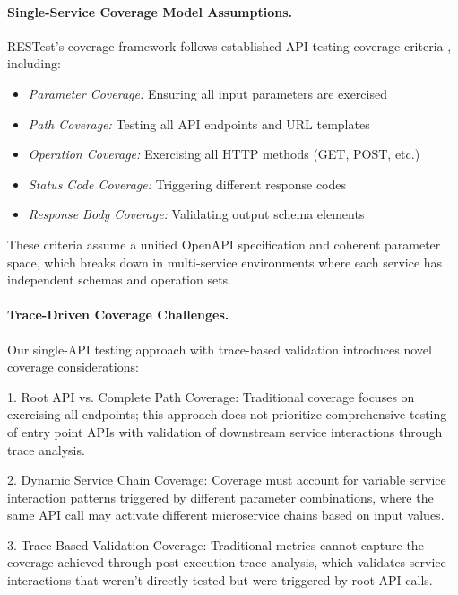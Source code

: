 \documentclass[conference]{IEEEtran}
\begin{document}
\paragraph{Single-Service Coverage Model Assumptions.}
RESTest's coverage framework follows established API testing coverage criteria \cite{martin2019restest}, including:
\begin{itemize}[leftmargin=*]
    \item \textit{Parameter Coverage:} Ensuring all input parameters are exercised
    \item \textit{Path Coverage:} Testing all API endpoints and URL templates  
    \item \textit{Operation Coverage:} Exercising all HTTP methods (GET, POST, etc.)
    \item \textit{Status Code Coverage:} Triggering different response codes
    \item \textit{Response Body Coverage:} Validating output schema elements
\end{itemize}

These criteria assume a unified OpenAPI specification and coherent parameter space, which breaks down in multi-service environments where each service has independent schemas and operation sets.

\paragraph{Trace-Driven Coverage Challenges.}
Our single-API testing approach with trace-based validation introduces novel coverage considerations:


1. Root API vs. Complete Path Coverage: Traditional coverage focuses on exercising all endpoints; this approach does not prioritize comprehensive testing of entry point APIs with validation of downstream service interactions through trace analysis.

2. Dynamic Service Chain Coverage: Coverage must account for variable service interaction patterns triggered by different parameter combinations, where the same API call may activate different microservice chains based on input values.

3. Trace-Based Validation Coverage: Traditional metrics cannot capture the coverage achieved through post-execution trace analysis, which validates service interactions that weren't directly tested but were triggered by root API calls.
\end{document}
